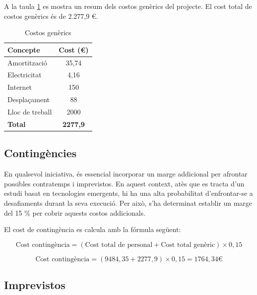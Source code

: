 \documentclass[a4paper,12pt]{report}
\begin{document}
A la taula \ref{tab:costos_generics} es mostra un resum dels costos genèrics del projecte. El cost total de costos genèrics és de 2.277,9 €.

\begin{table}[H]
    \centering
    \begin{tabular}{|l|c|}
    \hline
    \textbf{Concepte} & \textbf{Cost (€)} \\ \hline
    Amortització      & 35,74             \\
    Electricitat      & 4,16              \\
    Internet          & 150               \\
    Desplaçament      & 88                \\ 
    Lloc de treball   & 2000              \\ \hline
    \textbf{Total}    & \textbf{2277,9}  \\ \hline
    \end{tabular}
    \caption{Costos genèrics}
    \label{tab:costos_generics}
\end{table}

\subsection{Contingències}

En qualsevol iniciativa, és essencial incorporar un marge addicional per afrontar possibles contratemps i imprevistos. En aquest context, atès que es tracta d’un estudi basat en tecnologies emergents, hi ha una alta probabilitat d’enfrontar-se a desafiaments durant la seva execució. Per això, s’ha determinat establir un marge del 15 \% per cobrir aquests costos addicionals.

El cost de contingència es calcula amb la fórmula següent:

\begin{equation}
    \text{Cost contingència} = (\text{Cost total de personal} + \text{Cost total genèric}) \times 0,15
\end{equation}

\begin{equation}
    \text{Cost contingència} = (9484,35 + 2277,9) \times 0,15 = 1764,34 \text{€}
\end{equation}

\subsection{Imprevistos}
\end{document}
